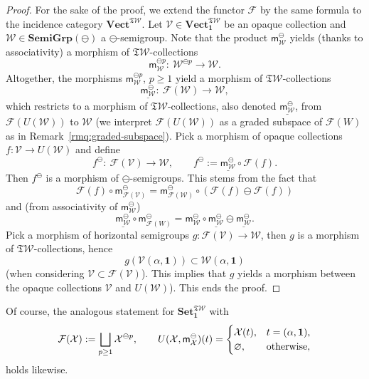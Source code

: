 \documentclass[pdftex]{sigma}
\newcommand{\SWc}{{\mathfrak{T}\mathcal{W}}}
\newcommand\hp{\mathsf{m}^{\ominus}}
\newcommand\CAT[1]{\mathbf{#1}}
\newcommand{\Vect}{\CAT{Vect}}
\newcommand{\Set}{\CAT{Set}}
\newcommand\sgominus{\CAT{SemiGrp}(\ominus)}
\newcommand\icsw{ \Vect^{\SWc} }
\numberwithin{equation}{section}
\begin{document}
\begin{proof}
For the sake of the proof, we extend the functor $\mathcal{F}$ by the same formula to the incidence category $\icsw$.
 Let $\mathcal V\in \Vect_{\mathbf{1}}^\SWc$ be an opaque collection and $\mathcal W\in \sgominus$ a $\ominus$-semigroup.
 Note that the product $\hp_{\mathcal{W}}$ yields (thanks to associativity) a morphism of $\SWc$-collections
 \[
 \mathsf{m}_{\mathcal{W}}^{\ominus p}\colon \ \mathcal{W}^{\ominus p} \to \mathcal{W}.
 \]
 Altogether, the morphisms $\mathsf{m}_{\mathcal{W}}^{\ominus p}$, $p \geq 1$ yield a morphism of $\SWc$-collections
 \[\underline{\hp_{\mathcal{W}}}\colon \ \mathcal{F}(\mathcal{W}) \to \mathcal{W},\]
 which restricts to a morphism of $\SWc$-collections, also denoted $\underline{\hp_{\mathcal{W}}}$, from $\mathcal{F}(U(\mathcal{W}))$ to $\mathcal{W}$ (we interpret $\mathcal{F}(U(\mathcal{W}))$ as a graded subspace of $\mathcal F(W)$ as in Remark~\ref{rmq:graded-subspace}).
 Pick a morphism of opaque collections $f \colon \mathcal{V}\to U(\mathcal{W})$ and define
 \[f^{\ominus}\colon \ \mathcal{F}(\mathcal{V})\to \mathcal{W} ,\qquad f^{\ominus} := \underline{\hp_{\mathcal{W}}}\circ \mathcal{F}(f).\]
 Then $f^{\ominus}$ is a morphism of $\ominus$-semigroups. This stems from the fact that
 \[
 \mathcal{F}(f) \circ \hp_{\mathcal{F}(\mathcal{V})} = \hp_{\mathcal{F}(\mathcal{W})} \circ (\mathcal{F}(f) \ominus \mathcal{F}(f))
 \]
 and (from associativity of $\hp_{\mathcal{W}}$)
 \[
 \underline{\hp_{\mathcal{W}}} \circ \hp_{\mathcal{F}(W)} = \hp_{\mathcal{W}} \circ \underline{\hp_{\mathcal{W}}} \ominus \underline{\hp_{\mathcal{W}}}.
 \]
 Pick a morphism of horizontal semigroups $g\colon \mathcal{F}(\mathcal{V}) \to \mathcal{W}$, then $g$ is a morphism of $\SWc$-collections, hence
 \[
 g(\mathcal{V}(\alpha,\mathbf{1})) \subset \mathcal{W}(\alpha,\mathbf{1})
 \]
 (when considering $\mathcal{V} \subset \mathcal{F}(\mathcal{V})$).
 This implies that $g$ yields a morphism between the opaque collections $\mathcal{V}$ and $U(\mathcal{W})$). This ends the proof.
 \end{proof}

 Of course, the analogous statement for $\Set_{\mathbf 1}^{\SWc}$ with
 \[\mathcal F(\mathcal X):=\bigsqcup_{p\geq 1} \mathcal X^{\ominus p},\qquad U(\mathcal{X}, \hp_{\mathcal{X}})(t)= \begin{cases} \mathcal{X} (t), & t=(\alpha,{\bf 1}), \\ \varnothing, & \text{otherwise}, \end{cases}
 \]
 holds likewise.
\end{document}
